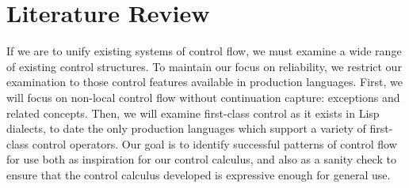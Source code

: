 \documentclass[11pt]{article}
\begin{document}
%
%
%
%
%
%
%

\part{Literature Review}

If we are to unify existing systems of control flow, we must examine a wide range of existing control structures. To maintain our focus on reliability, we restrict our examination to those control features available in production languages. First, we will focus on non-local control flow without continuation capture: exceptions and related concepts. Then, we will examine first-class control as it exists in Lisp dialects, to date the only production languages which support a variety of first-class control operators. Our goal is to identify successful patterns of control flow for use both as inspiration for our control calculus, and also as a sanity check to ensure that the control calculus developed is expressive enough for general use.
\end{document}
